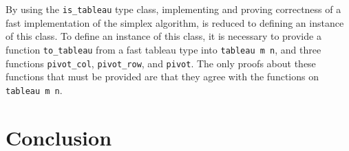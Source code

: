 \documentclass[11pt]{article} %
\begin{document}
By using the \lstinline|is_tableau| type class, implementing and proving correctness of a fast implementation of the simplex algorithm, is reduced to defining an instance of this class. To define an instance of this class, it is necessary to provide a function \lstinline|to_tableau| from a fast tableau type into \lstinline|tableau m n|, and three functions \lstinline|pivot_col|, \lstinline|pivot_row|, and \lstinline|pivot|. The only proofs about these functions that must be provided are that they agree with the functions on \lstinline|tableau m n|. 



\section{Conclusion}

\end{document}
